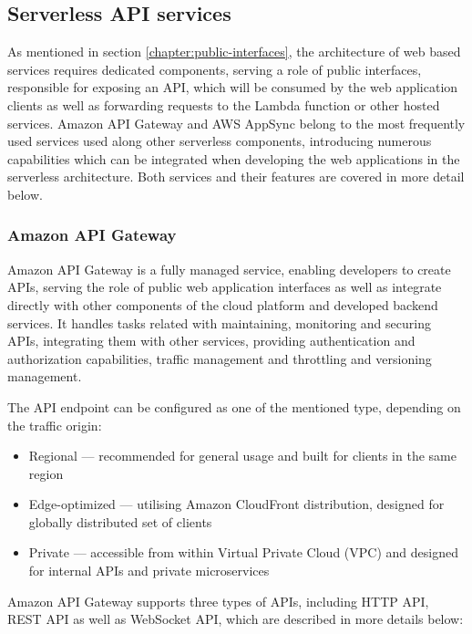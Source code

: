\subsection{Serverless API services} \label{chapter:serverless-client-communication-patterns-for-serverless-architecture}

As mentioned in section \ref{chapter:public-interfaces}, the architecture of web based services requires dedicated components, serving a role of public interfaces, responsible for exposing an API, which will be consumed by the web application clients as well as forwarding requests to the Lambda function or other hosted services.
Amazon API Gateway and AWS AppSync belong to the most frequently used services used along other serverless components, introducing numerous capabilities which can be integrated when developing the web applications in the serverless architecture.
Both services and their features are covered in more detail below.

\subsubsection{Amazon API Gateway}

Amazon API Gateway \cite{ApiGateway} is a fully managed service, enabling developers to create APIs, serving the role of public web application interfaces as well as integrate directly with other components of the cloud platform and developed backend services.
It handles tasks related with maintaining, monitoring and securing APIs, integrating them with other services, providing authentication and authorization capabilities, traffic management and throttling and versioning management.

The API endpoint can be configured as one of the mentioned type, depending on the traffic origin:

\begin{itemize}
   \item Regional --- recommended for general usage and built for clients in the same region
   \item Edge-optimized --- utilising Amazon CloudFront distribution, designed for globally distributed set of clients
   \item Private --- accessible from within Virtual Private Cloud (VPC) and designed for internal APIs and private microservices
\end{itemize}

Amazon API Gateway supports three types of APIs, including HTTP API, REST API as well as WebSocket API, which are described in more details below:

